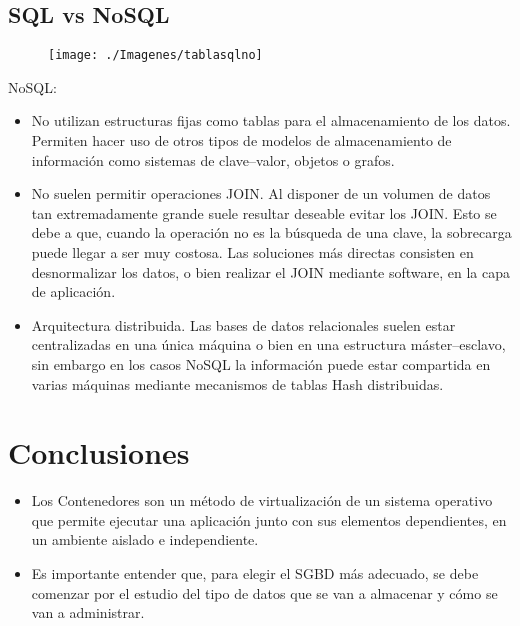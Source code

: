 \documentclass[%
 reprint,
 amsmath,amssymb,
 aps,
]{revtex4-1}
\begin{document}
\subsection{SQL vs NoSQL}
	\begin{figure}[htb]
	\begin{center}
	\texttt{[image: ./Imagenes/tablasqlno]}
	\end{center}
	\end{figure}
	\par NoSQL: 
	\begin{itemize}
	\item No utilizan estructuras fijas como tablas para el almacenamiento de los datos. Permiten hacer uso de otros tipos de modelos de almacenamiento de información como sistemas de clave–valor, objetos o grafos.
	\item No suelen permitir operaciones JOIN. Al disponer de un volumen de datos tan extremadamente grande suele resultar deseable evitar los JOIN. Esto se debe a que, cuando la operación no es la búsqueda de una clave, la sobrecarga puede llegar a ser muy costosa. Las soluciones más directas consisten en desnormalizar los datos, o bien realizar el JOIN mediante software, en la capa de aplicación.
	\item Arquitectura distribuida. Las bases de datos relacionales suelen estar centralizadas en una única máquina o bien en una estructura máster–esclavo, sin embargo en los casos NoSQL la información puede estar compartida en varias máquinas mediante mecanismos de tablas Hash distribuidas.
	\end{itemize}
	\cite{comparison}
	


\section{Conclusiones}\label{sec:6}


\begin{itemize}
	\item Los Contenedores son un método de virtualización de un sistema operativo que permite ejecutar una aplicación junto con sus elementos dependientes, en un ambiente aislado e independiente.
	\item Es importante entender que, para elegir el SGBD más adecuado, se debe comenzar por el estudio del tipo de datos que se van a almacenar y cómo se van a administrar.
\end{itemize}







\end{document}
